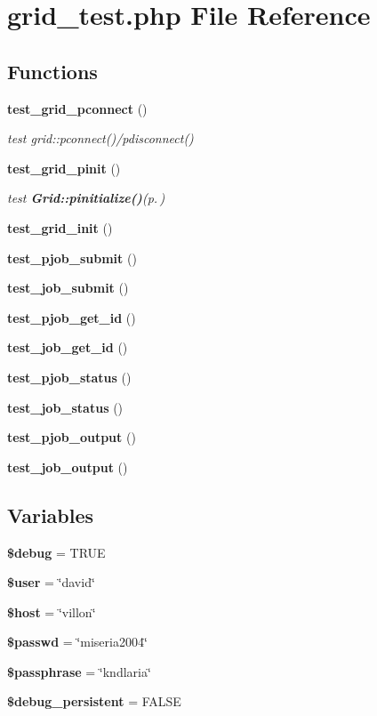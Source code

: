 \section{grid\_\-test.php File Reference}
\label{grid__test_8php}
\subsection*{Functions}
\begin{CompactItemize}
\item 
{\bf test\_\-grid\_\-pconnect} ()
\begin{CompactList}\small\item\em test grid::pconnect()/pdisconnect() \item\end{CompactList}\item 
{\bf test\_\-grid\_\-pinit} ()
\begin{CompactList}\small\item\em test {\bf Grid::pinitialize()}{\rm (p.\,\pageref{classGrid_a11})} \item\end{CompactList}\item 
{\bf test\_\-grid\_\-init} ()
\item 
{\bf test\_\-pjob\_\-submit} ()
\item 
{\bf test\_\-job\_\-submit} ()
\item 
{\bf test\_\-pjob\_\-get\_\-id} ()
\item 
{\bf test\_\-job\_\-get\_\-id} ()
\item 
{\bf test\_\-pjob\_\-status} ()
\item 
{\bf test\_\-job\_\-status} ()
\item 
{\bf test\_\-pjob\_\-output} ()
\item 
{\bf test\_\-job\_\-output} ()
\end{CompactItemize}
\subsection*{Variables}
\begin{CompactItemize}
\item 
{\bf \$debug} = TRUE
\item 
{\bf \$user} = \char`\"{}david\char`\"{}
\item 
{\bf \$host} = \char`\"{}villon\char`\"{}
\item 
{\bf \$passwd} = \char`\"{}miseria2004\char`\"{}
\item 
{\bf \$passphrase} = \char`\"{}kndlaria\char`\"{}
\item 
{\bf \$debug\_\-persistent} = FALSE
\end{CompactItemize}


